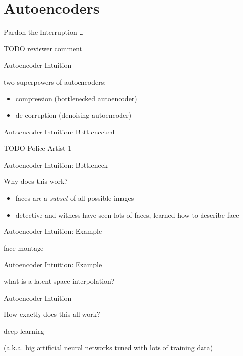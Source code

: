 \section{Autoencoders}

\begin{frame}{Pardon the Interruption \dots}

TODO reviewer comment

\end{frame}

\begin{frame}{Autoencoder Intuition}

two superpowers of autoencoders:
\begin{itemize}

\item compression (bottlenecked autoencoder)

\item de-corruption (denoising autoencoder)

\end{itemize}

\end{frame}

\begin{frame}{Autoencoder Intuition: Bottlenecked}

TODO Police Artist 1

\end{frame}

\begin{frame}{Autoencoder Intuition: Bottleneck}

Why does this work?

\begin{itemize}

\item faces are a \textit{subset} of all possible images
\item detective and witness have seen lots of faces, learned how to describe face

\end{itemize}

\end{frame}

\begin{frame}{Autoencoder Intuition: Example}

face montage

\end{frame}

\begin{frame}{Autoencoder Intuition: Example}

what is a latent-space interpolation?

\end{frame}

\begin{frame}{Autoencoder Intuition}

How exactly does this all work?

deep learning

(a.k.a. big artificial neural networks tuned with lots of training data)

\end{frame}
